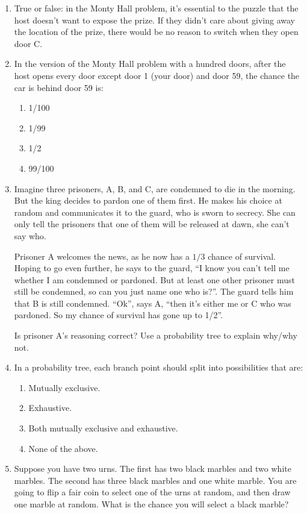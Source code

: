 \documentclass[justified]{tufte-book}
\providecommand{\tightlist}{%
  \setlength{\itemsep}{0pt}\setlength{\parskip}{0pt}}
\theoremstyle{definition}
\theoremstyle{definition}
\theoremstyle{definition}
\theoremstyle{remark}
\begin{document}
\begin{enumerate}
\item
  True or false: in the Monty Hall problem, it's essential to the puzzle
  that the host doesn't want to expose the prize. If they didn't care
  about giving away the location of the prize, there would be no reason
  to switch when they open door C.
\item
  In the version of the Monty Hall problem with a hundred doors, after
  the host opens every door except door 1 (your door) and door 59, the
  chance the car is behind door 59 is:

  \begin{enumerate}
  \def\labelenumii{\alph{enumii}.}
  \tightlist
  \item
    1/100
  \item
    1/99
  \item
    1/2
  \item
    99/100
  \end{enumerate}
\item
  Imagine three prisoners, A, B, and C, are condemned to die in the
  morning. But the king decides to pardon one of them first. He makes
  his choice at random and communicates it to the guard, who is sworn to
  secrecy. She can only tell the prisoners that one of them will be
  released at dawn, she can't say who.

  Prisoner A welcomes the news, as he now has a \(1/3\) chance of
  survival. Hoping to go even further, he says to the guard, ``I know
  you can't tell me whether I am condemned or pardoned. But at least one
  other prisoner must still be condemned, so can you just name one who
  is?''. The guard tells him that B is still condemned. ``Ok'', says A,
  ``then it's either me or C who was pardoned. So my chance of survival
  has gone up to 1/2''.

  Is prisoner A's reasoning correct? Use a probability tree to explain
  why/why not.
\item
  In a probability tree, each branch point should split into
  possibilities that are:

  \begin{enumerate}
  \def\labelenumii{\alph{enumii}.}
  \tightlist
  \item
    Mutually exclusive.
  \item
    Exhaustive.
  \item
    Both mutually exclusive and exhaustive.
  \item
    None of the above.
  \end{enumerate}
\item
  Suppose you have two urns. The first has two black marbles and two
  white marbles. The second has three black marbles and one white
  marble. You are going to flip a fair coin to select one of the urns at
  random, and then draw one marble at random. What is the chance you
  will select a black marble?


\end{enumerate}
\end{document}
